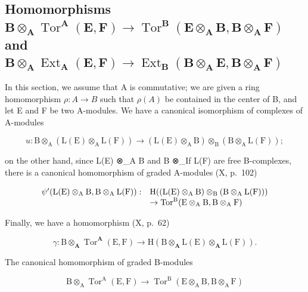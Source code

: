 \subsection{\texorpdfstring{Homomorphisms \(\mathbf{B} \otimes_{\mathbf{A}} \operatorname{Tor}^{\mathbf{A}}(\mathbf{E}, \mathbf{F}) \to \operatorname{Tor}^{\mathbf{B}}(\mathbf{E} \otimes_{\mathbf{A}} \mathbf{B}, \mathbf{B} \otimes_{\mathbf{A}} \mathbf{F})\) and \(\mathbf{B} \otimes_{\mathbf{A}} \operatorname{Ext}_{\mathbf{A}}(\mathbf{E}, \mathbf{F}) \to \operatorname{Ext}_{\mathbf{B}}(\mathbf{B} \otimes_{\mathbf{A}} \mathbf{E}, \mathbf{B} \otimes_{\mathbf{A}} \mathbf{F})\)}{Extension-of-scalars homomorphisms for Tor and Ext}}

In this section, we assume that A is commutative; we are given a ring homomorphism \(\rho: A \to B\) such that \(\rho(A)\) be contained in the center of B, and let E and F be two A-modules. We have a canonical isomorphism of complexes of A-modules

\[
u: \mathrm{B} \otimes_ {\mathrm{A}} (\mathrm{L} (\mathrm{E}) \otimes_ {\mathrm{A}} \mathrm{L} (\mathrm{F})) \rightarrow (\mathrm{L} (\mathrm{E}) \otimes_ {\mathrm{A}} \mathrm{B}) \otimes_ {\mathrm{B}} (\mathrm{B} \otimes_ {\mathrm{A}} \mathrm{L} (\mathrm{F}));
\]

on the other hand, since L(E) ⊗\_A B and B ⊗\_If L(F) are free B-complexes, there is a canonical homomorphism of graded A-modules (X, p.~102)

\[
\begin{array}{r l} \psi^ {\prime} (\mathrm{L(E)} \otimes_ {\mathrm{A}} \mathrm{B}, \mathrm{B} \otimes_ {\mathrm{A}} \mathrm{L(F)}): & \mathrm{H} ((\mathrm{L(E)} \otimes_ {\mathrm{A}} \mathrm{B}) \otimes_ {\mathrm{B}} (\mathrm{B} \otimes_ {\mathrm{A}} \mathrm{L(F)})) \\ & \to \operatorname{Tor} ^ {\mathrm{B}} (\mathrm{E} \otimes_ {\mathrm{A}} \mathrm{B}, \mathrm{B} \otimes_ {\mathrm{A}} \mathrm{F}) \end{array}
\]

Finally, we have a homomorphism (X, p.~62)

\[
\gamma : \mathrm{B} \otimes_ {\mathbf {A}} \operatorname{Tor} ^ {\mathbf {A}} (\mathrm{E}, \mathrm{F}) \rightarrow \mathrm{H} (\mathrm{B} \otimes_ {\mathbf {A}} \mathrm{L} (\mathrm{E}) \otimes_ {\mathbf {A}} \mathrm{L} (\mathrm{F})) .
\]

The canonical homomorphism of graded B-modules

\[
\mathrm{B} \otimes_ {\mathrm{A}} \operatorname{Tor} ^ {\mathrm{A}} (\mathrm{E}, \mathrm{F}) \rightarrow \operatorname{Tor} ^ {\mathrm{B}} (\mathrm{E} \otimes_ {\mathrm{A}} \mathrm{B}, \mathrm{B} \otimes_ {\mathrm{A}} \mathrm{F})\tag{13}
\]

